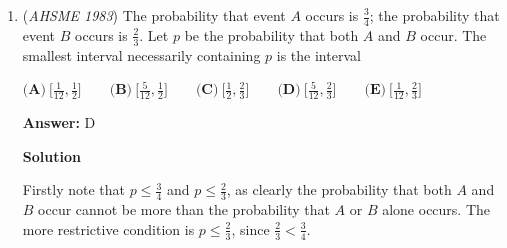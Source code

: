 \begin{enumerate}
 \textbf{Answer: }B



\textbf{Solution 1}

We have that $12=\frac{60}{5}$. We can substitute our value for 5, to get
 \[12=\frac{60}{60^b}=60\cdot 60^{-b}=60^{1-b}.\]Hence
 \[12^{(1-a-b)/\left(2\left(1-b\right)\right)}=60^{(1-b)(1-a-b)/\left(2\left(1-b\right)\right)}=60^{(1-a-b)/2}.\]Since $4=\frac{60}{3\cdot 5}$, we have
 \[4=\frac{60}{60^a 60^b}=60^{1-a-b}.\]Therefore, we have
 \[60^{(1-a-b)/2}=4^{1/2}=\boxed{\textbf{(B)}\ 2}\]




\textbf{Solution 2}

We have $60^a = 3$ and $60^b = 5$. We can say that $a = \log_{60} 3$ and $b = \log_{60} 5$. 

 
 \[12^{(1-a-b)/[2(1-b)]} = 12^{(1-(a+b))/[2(1-b)]}\]

 We can evaluate (a+b) by the Addition Identity for Logarithms, $(a+b) = \log_{60} 15$. Also, $1 = \log_{60} 60$. 

 
 \[(1-(a+b) = \log_{60} 60 - \log_{60} 15 = \log_{60} 4\]

 Now we have to evaluate [2(1-b)], the denominator of the fractional exponent. Once again, we can say $1 = \log_{60} 60$

 \[2(1-b) = 2(\log_{60} 12)\]

 \[12^{(\log_{60} 4)/[2(\log_{60} 12]}  = 12^{\frac{1}{2} \cdot \log_{12} 4} = 4^{1/2} = 2\]



	\item (\textit{AHSME 1983}) The probability that event $A$ occurs is $\frac{3}{4}$; the probability that event $B$ occurs is $\frac{2}{3}$. 
Let $p$ be the probability that both $A$ and $B$ occur. The smallest interval necessarily containing $p$ is the interval


 $\textbf{(A)}\ \Big[\frac{1}{12},\frac{1}{2}\Big]\qquad \textbf{(B)}\ \Big[\frac{5}{12},\frac{1}{2}\Big]\qquad \textbf{(C)}\ \Big[\frac{1}{2},\frac{2}{3}\Big]\qquad \textbf{(D)}\ \Big[\frac{5}{12},\frac{2}{3}\Big]\qquad \textbf{(E)}\ \Big[\frac{1}{12},\frac{2}{3}\Big]$

 \textbf{Answer: }D



\textbf{Solution}

Firstly note that $p \leq \frac{3}{4}$ and $p \leq \frac{2}{3}$, as clearly the probability that both $A$ and $B$ occur cannot be more than the probability that $A$ or $B$ alone occurs. The more restrictive condition is $p \leq \frac{2}{3}$, since $\frac{2}{3} < \frac{3}{4}$. 


\end{enumerate}
